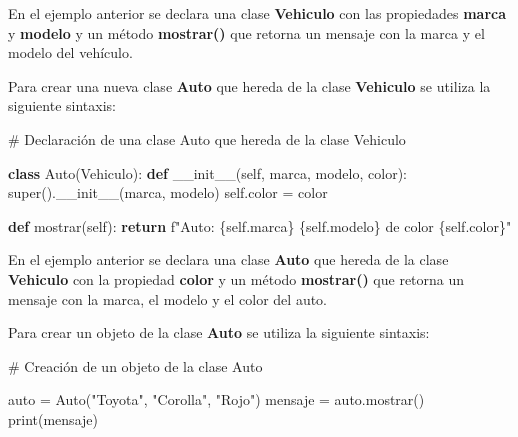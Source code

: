 \documentclass[
  a4paper,
  DIV=11,
  numbers=noendperiod,
  onepage,
  openany]{scrreprt}
\newenvironment{Shaded}{\begin{snugshade}}{\end{snugshade}}
\newcommand{\BuiltInTok}[1]{\textcolor[rgb]{0.00,0.23,0.31}{#1}}
\newcommand{\CommentTok}[1]{\textcolor[rgb]{0.37,0.37,0.37}{#1}}
\newcommand{\ControlFlowTok}[1]{\textcolor[rgb]{0.00,0.23,0.31}{\textbf{#1}}}
\newcommand{\FunctionTok}[1]{\textcolor[rgb]{0.28,0.35,0.67}{#1}}
\newcommand{\KeywordTok}[1]{\textcolor[rgb]{0.00,0.23,0.31}{\textbf{#1}}}
\newcommand{\NormalTok}[1]{\textcolor[rgb]{0.00,0.23,0.31}{#1}}
\newcommand{\OperatorTok}[1]{\textcolor[rgb]{0.37,0.37,0.37}{#1}}
\newcommand{\SpecialCharTok}[1]{\textcolor[rgb]{0.37,0.37,0.37}{#1}}
\newcommand{\SpecialStringTok}[1]{\textcolor[rgb]{0.13,0.47,0.30}{#1}}
\newcommand{\StringTok}[1]{\textcolor[rgb]{0.13,0.47,0.30}{#1}}
\newcommand{\VariableTok}[1]{\textcolor[rgb]{0.07,0.07,0.07}{#1}}
\begin{document}
En el ejemplo anterior se declara una clase \textbf{Vehiculo} con las
propiedades \textbf{marca} y \textbf{modelo} y un método
\textbf{mostrar()} que retorna un mensaje con la marca y el modelo del
vehículo.

Para crear una nueva clase \textbf{Auto} que hereda de la clase
\textbf{Vehiculo} se utiliza la siguiente sintaxis:

\begin{Shaded}
\begin{Highlighting}[]
\CommentTok{\# Declaración de una clase Auto que hereda de la clase Vehiculo}

\KeywordTok{class}\NormalTok{ Auto(Vehiculo):}
    \KeywordTok{def} \FunctionTok{\_\_init\_\_}\NormalTok{(}\VariableTok{self}\NormalTok{, marca, modelo, color):}
        \BuiltInTok{super}\NormalTok{().}\FunctionTok{\_\_init\_\_}\NormalTok{(marca, modelo)}
        \VariableTok{self}\NormalTok{.color }\OperatorTok{=}\NormalTok{ color}

    \KeywordTok{def}\NormalTok{ mostrar(}\VariableTok{self}\NormalTok{):}
        \ControlFlowTok{return} \SpecialStringTok{f"Auto: }\SpecialCharTok{\{}\VariableTok{self}\SpecialCharTok{.}\NormalTok{marca}\SpecialCharTok{\}}\SpecialStringTok{ }\SpecialCharTok{\{}\VariableTok{self}\SpecialCharTok{.}\NormalTok{modelo}\SpecialCharTok{\}}\SpecialStringTok{ de color }\SpecialCharTok{\{}\VariableTok{self}\SpecialCharTok{.}\NormalTok{color}\SpecialCharTok{\}}\SpecialStringTok{"}
\end{Highlighting}
\end{Shaded}

En el ejemplo anterior se declara una clase \textbf{Auto} que hereda de
la clase \textbf{Vehiculo} con la propiedad \textbf{color} y un método
\textbf{mostrar()} que retorna un mensaje con la marca, el modelo y el
color del auto.

Para crear un objeto de la clase \textbf{Auto} se utiliza la siguiente
sintaxis:

\begin{Shaded}
\begin{Highlighting}[]
\CommentTok{\# Creación de un objeto de la clase Auto}

\NormalTok{auto }\OperatorTok{=}\NormalTok{ Auto(}\StringTok{"Toyota"}\NormalTok{, }\StringTok{"Corolla"}\NormalTok{, }\StringTok{"Rojo"}\NormalTok{)}
\NormalTok{mensaje }\OperatorTok{=}\NormalTok{ auto.mostrar()}
\BuiltInTok{print}\NormalTok{(mensaje)}
\end{Highlighting}
\end{Shaded}
\end{document}

